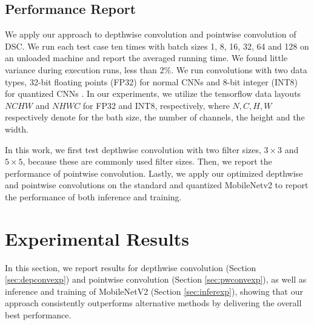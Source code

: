 \subsection{Performance Report}
We apply our approach to depthwise convolution and pointwise convolution of DSC.  We run each test case ten times with batch sizes 1, 8,
16, 32, 64 and 128 on an unloaded machine and report the averaged running time. We found little variance during execution runs, less than
2\%. We run convolutions with two data types, 32-bit floating points (FP32) for normal CNNs and 8-bit integer (INT8) for quantized CNNs
\FIXME{\cite{}}. In our experiments, we utilize the tensorflow data layouts $NCHW$ and $NHWC$ for FP32 and INT8, respectively, where $N, C,
H, W$ respectively denote for the bath size, the number of channels, the height and the width. 

In this work, we first test depthwise convolution with two filter sizes, $3 \times 3$ and $5 \times 5$, because these are commonly used
filter sizes. Then, we report the performance of pointwise convolution. Lastly, we apply our optimized depthwise and pointwise convolutions
on the standard and quantized MobileNetv2 to report the performance of both inference and training.
%

\section{Experimental Results}
\label{exp} In this section, we report results for depthwise convolution (Section \ref{sec:depconvexp}) and pointwise convolution (Section
\ref{sec:pwconvexp}), as well as inference and training of MobileNetV2 (Section \ref{sec:inferexp}), showing that our approach consistently
outperforms alternative methods by delivering the overall best performance.


